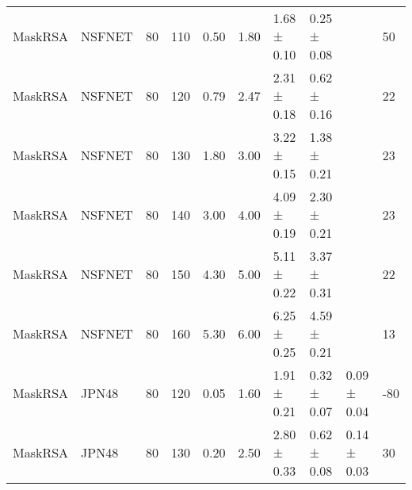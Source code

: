 \begin{longtable}[!htbp]{llll|lllll|l}
MaskRSA              & NSFNET            & 80                   & 110                                                               & 0.50  & \multicolumn{1}{l|}{1.80}     & 1.68 ± 0.10  & 0.25 ± 0.08            &                   & 50                                                                                     \\
MaskRSA              & NSFNET            & 80                   & 120                                                               & 0.79 & \multicolumn{1}{l|}{2.47}    & 2.31 ± 0.18 & 0.62 ± 0.16      &                   & 22                                                                                    \\
MaskRSA              & NSFNET            & 80                   & 130                                                               & 1.80  & \multicolumn{1}{l|}{3.00}       & 3.22 ± 0.15 & 1.38 ± 0.21            &                   & 23                                                                                     \\
MaskRSA              & NSFNET            & 80                   & 140                                                               & 3.00    & \multicolumn{1}{l|}{4.00}       & 4.09 ± 0.19 & 2.30 ± 0.21            &                   & 23                                                                                     \\
MaskRSA              & NSFNET            & 80                   & 150                                                               & 4.30  & \multicolumn{1}{l|}{5.00}       & 5.11 ± 0.22 & 3.37 ± 0.31           &                   & 22                                                                                     \\
MaskRSA              & NSFNET            & 80                   & 160                                                               & 5.30  & \multicolumn{1}{l|}{6.00}       & 6.25 ± 0.25 & 4.59 ± 0.21            &                   & 13                                                                                     \\
MaskRSA              & JPN48             & 80                   & 120                                                               & 0.05 & \multicolumn{1}{l|}{1.60}     & 1.91 ± 0.21 & 0.32 ± 0.07      & 0.09 ± 0.04       & -80                                                                                     \\
MaskRSA              & JPN48             & 80                   & 130                                                               & 0.20  & \multicolumn{1}{l|}{2.50}     & 2.80 ± 0.33  & 0.62 ± 0.08      & 0.14 ± 0.03       & 30                                                                                      \\

\end{longtable}
